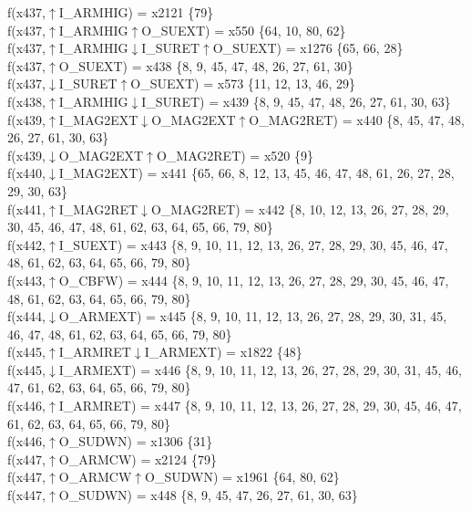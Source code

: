f(x437,$\uparrow$I\_ARMHIG) = x2121 \{79\} \\  
f(x437,$\uparrow$I\_ARMHIG$\uparrow$O\_SUEXT) = x550 \{64, 10, 80, 62\} \\  
f(x437,$\uparrow$I\_ARMHIG$\downarrow$I\_SURET$\uparrow$O\_SUEXT) = x1276 \{65, 66, 28\} \\  
f(x437,$\uparrow$O\_SUEXT) = x438 \{8, 9, 45, 47, 48, 26, 27, 61, 30\} \\  
f(x437,$\downarrow$I\_SURET$\uparrow$O\_SUEXT) = x573 \{11, 12, 13, 46, 29\} \\  
f(x438,$\uparrow$I\_ARMHIG$\downarrow$I\_SURET) = x439 \{8, 9, 45, 47, 48, 26, 27, 61, 30, 63\} \\  
f(x439,$\uparrow$I\_MAG2EXT$\downarrow$O\_MAG2EXT$\uparrow$O\_MAG2RET) = x440 \{8, 45, 47, 48, 26, 27, 61, 30, 63\} \\  
f(x439,$\downarrow$O\_MAG2EXT$\uparrow$O\_MAG2RET) = x520 \{9\} \\  
f(x440,$\downarrow$I\_MAG2EXT) = x441 \{65, 66, 8, 12, 13, 45, 46, 47, 48, 61, 26, 27, 28, 29, 30, 63\} \\  
f(x441,$\uparrow$I\_MAG2RET$\downarrow$O\_MAG2RET) = x442 \{8, 10, 12, 13, 26, 27, 28, 29, 30, 45, 46, 47, 48, 61, 62, 63, 64, 65, 66, 79, 80\} \\  
f(x442,$\uparrow$I\_SUEXT) = x443 \{8, 9, 10, 11, 12, 13, 26, 27, 28, 29, 30, 45, 46, 47, 48, 61, 62, 63, 64, 65, 66, 79, 80\} \\  
f(x443,$\uparrow$O\_CBFW) = x444 \{8, 9, 10, 11, 12, 13, 26, 27, 28, 29, 30, 45, 46, 47, 48, 61, 62, 63, 64, 65, 66, 79, 80\} \\  
f(x444,$\downarrow$O\_ARMEXT) = x445 \{8, 9, 10, 11, 12, 13, 26, 27, 28, 29, 30, 31, 45, 46, 47, 48, 61, 62, 63, 64, 65, 66, 79, 80\} \\  
f(x445,$\uparrow$I\_ARMRET$\downarrow$I\_ARMEXT) = x1822 \{48\} \\  
f(x445,$\downarrow$I\_ARMEXT) = x446 \{8, 9, 10, 11, 12, 13, 26, 27, 28, 29, 30, 31, 45, 46, 47, 61, 62, 63, 64, 65, 66, 79, 80\} \\  
f(x446,$\uparrow$I\_ARMRET) = x447 \{8, 9, 10, 11, 12, 13, 26, 27, 28, 29, 30, 45, 46, 47, 61, 62, 63, 64, 65, 66, 79, 80\} \\  
f(x446,$\uparrow$O\_SUDWN) = x1306 \{31\} \\  
f(x447,$\uparrow$O\_ARMCW) = x2124 \{79\} \\  
f(x447,$\uparrow$O\_ARMCW$\uparrow$O\_SUDWN) = x1961 \{64, 80, 62\} \\  
f(x447,$\uparrow$O\_SUDWN) = x448 \{8, 9, 45, 47, 26, 27, 61, 30, 63\} \\  
